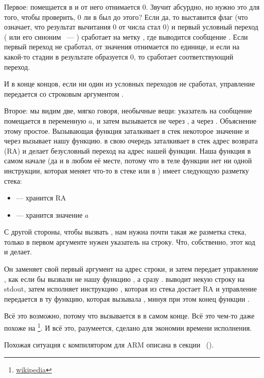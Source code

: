 Первое:  помещается в \EAX и от него отнимается 0. Звучит абсурдно, но нужно это для того, чтобы проверить, 
0 ли в \EAX был до этого? Если да, то выставится флаг \ZF (что означает, что результат вычитания 0 от числа 
стал 0) и первый условный переход \JE ( или его синоним \JZ~--- ) 
сработает на метку , где выводится сообщение .
Если первый переход не сработал, от значения отнимается по единице, 
и если на какой-то стадии в результате образуется 0, то сработает соответствующий переход.

И в конце концов, если ни один из условных переходов не сработал, управление передается \printf
со строковым аргументом .

\label{jump_to_last_printf}
\myindex{\Stack}
Второе: мы видим две, мягко говоря, необычные вещи: указатель на сообщение помещается в переменную $a$, 
и затем \printf вызывается не через \CALL, а через \JMP. Объяснение этому простое. 
Вызывающая функция заталкивает в стек некоторое значение и через \CALL вызывает нашу функцию. 
\CALL в свою очередь заталкивает в стек адрес возврата (\ac{RA}) и делает безусловный переход на адрес нашей функции. 
Наша функция в самом начале (да и в любом её месте, потому что в теле функции нет ни одной инструкции, 
которая меняет что-то в стеке или в \ESP) имеет следующую разметку стека:

\begin{itemize}
\item\ESP --- хранится \ac{RA}
\item{} --- хранится значение $a$ 
\end{itemize}

С другой стороны, чтобы вызвать \printf, нам нужна почти такая же разметка стека, 
только в первом аргументе нужен указатель на строку. Что, собственно, этот код и делает.

Он заменяет свой первый аргумент на адрес строки, и затем передает управление \printf, как если бы вызвали не 
нашу функцию \ttf, а сразу \printf. 
\printf выводит некую строку на \gls{stdout}, затем исполняет инструкцию \RET, 
которая из стека достает \ac{RA} и управление передается в ту функцию, 
которая вызывала \ttf, минуя при этом конец функции \ttf.

\newcommand{\URLSJ}{\href{http://go.yurichev.com/17121}{wikipedia}}
Всё это возможно, потому что \printf вызывается в \ttf в самом конце. 
Всё это чем-то даже похоже на \footnote{\URLSJ}.
И всё это, разумеется, сделано для экономии времени исполнения.

Похожая ситуация с компилятором для ARM описана в секции \q{\PrintfSeveralArgumentsSectionName}~().



